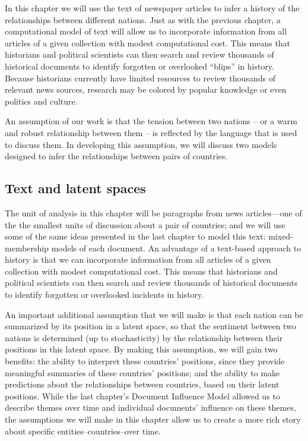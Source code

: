 In this chapter we will use the text of newspaper articles to infer a
history of the relationships between different nations.  Just as with
the previous chapter, a computational model of text will allow us to
incorporate information from all articles of a given collection with
modest computational cost.  This means that historians and political
scientists can then search and review thousands of historical
documents to identify forgotten or overlooked ``blips'' in history.
Because historians currently have limited resources to review
thousands of relevant news sources, research may be colored by popular
knowledge or even politics and culture.

An assumption of our work is that the tension between two nations --
or a warm and robust relationship between them -- is reflected by the
language that is used to discuss them.  In developing this assumption,
we will discuss two models designed to infer the relationships between
pairs of countries.

\subsection*{Text and latent spaces}
The unit of analysis in this chapter will be paragraphs from news
articles---one of the the smallest units of discussion about a pair of
countries; and we will use some of the same ideas presented in the last chapter to model this text: mixed-membership models of each document.  An advantage of a text-based approach to history is that
we can incorporate information from all articles of a given collection
with modest computational cost.  This means that historians and
political scientists can then search and review thousands of
historical documents to identify forgotten or overlooked incidents in
history.

An important additional assumption that we will make is that each
nation can be summarized by its position in a latent space, so that
the sentiment between two nations is determined (up to stochasticity)
by the relationship between their positions in this latent space.  By
making this assumption, we will gain two benefits: the ability to
interpret these countries' positions, since they provide meaningful
summaries of these countries' positions; and the ability to make
predictions about the relationships between countries, based on their
latent positions. While the last chapter's Document Influence Model
allowed us to describe themes over time and individual documents'
influence on these themes, the assumptions we will make in this
chapter allow us to create a more rich story about specific
entities--countries--over time.

